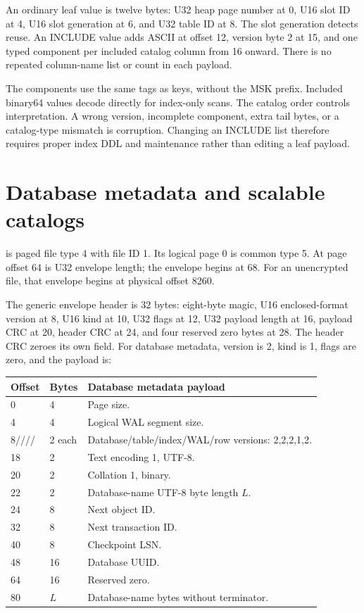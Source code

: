 An ordinary leaf value is twelve bytes: U32 heap page number at 0, U16 slot ID at 4, U16 slot generation at 6, and U32 table ID at 8. The slot generation detects reuse. An INCLUDE value adds ASCII  at offset 12, version byte 2 at 15, and one typed component per included catalog column from 16 onward. There is no repeated column-name list or count in each payload.

The components use the same tags as keys, without the MSK prefix. Included binary64 values decode directly for index-only scans. The catalog order controls interpretation. A wrong version, incomplete component, extra tail bytes, or a catalog-type mismatch is corruption. Changing an INCLUDE list therefore requires proper index DDL and maintenance rather than editing a leaf payload.


\section{Database metadata and scalable catalogs}

 is paged file type 4 with file ID 1. Its logical page 0 is common type 5. At page offset 64 is U32 envelope length; the  envelope begins at 68. For an unencrypted file, that envelope begins at physical offset 8260.

The generic envelope header is 32 bytes: eight-byte magic, U16 enclosed-format version at 8, U16 kind at 10, U32 flags at 12, U32 payload length at 16, payload CRC at 20, header CRC at 24, and four reserved zero bytes at 28. The header CRC zeroes its own field. For database metadata, version is 2, kind is 1, flags are zero, and the payload is:

\begin{longtable}{p{.12\linewidth}p{.12\linewidth}p{.65\linewidth}}
\toprule Offset & Bytes & Database metadata payload \\\midrule
0 & 4 & Page size. \\
4 & 4 & Logical WAL segment size. \\
8/\allowbreak10/\allowbreak12/\allowbreak14/\allowbreak16 & 2 each & Database/table/index/WAL/row versions: 2,2,2,1,2. \\
18 & 2 & Text encoding 1, UTF-8. \\
20 & 2 & Collation 1, binary. \\
22 & 2 & Database-name UTF-8 byte length $L$. \\
24 & 8 & Next object ID. \\
32 & 8 & Next transaction ID. \\
40 & 8 & Checkpoint LSN. \\
48 & 16 & Database UUID. \\
64 & 16 & Reserved zero. \\
80 & $L$ & Database-name bytes without terminator. \\
\bottomrule
\end{longtable}

